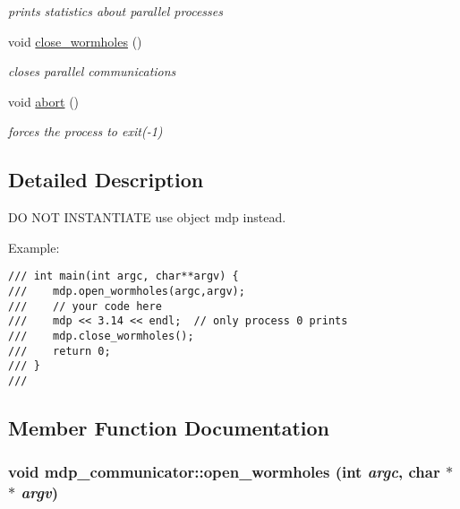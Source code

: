 \begin{CompactItemize}
\begin{CompactList}\small\item\em prints statistics about parallel processes \item\end{CompactList}\item 
\hypertarget{classmdp__communicator_d9941f7db0a5a447e37e8372b15f83f9}{
void \hyperlink{classmdp__communicator_d9941f7db0a5a447e37e8372b15f83f9}{close\_\-wormholes} ()}
\label{classmdp__communicator_d9941f7db0a5a447e37e8372b15f83f9}

\begin{CompactList}\small\item\em closes parallel communications \item\end{CompactList}\item 
\hypertarget{classmdp__communicator_a601b7788f242a7f71b955a6bdf7e002}{
void \hyperlink{classmdp__communicator_a601b7788f242a7f71b955a6bdf7e002}{abort} ()}
\label{classmdp__communicator_a601b7788f242a7f71b955a6bdf7e002}

\begin{CompactList}\small\item\em forces the process to exit(-1) \item\end{CompactList}\end{CompactItemize}


\subsection{Detailed Description}
DO NOT INSTANTIATE use object mdp instead. 

Example: 

\footnotesize\begin{verbatim}
/// int main(int argc, char**argv) {
///    mdp.open_wormholes(argc,argv);
///    // your code here
///    mdp << 3.14 << endl;  // only process 0 prints
///    mdp.close_wormholes();
///    return 0;
/// }
/// \end{verbatim}
\normalsize
 

\subsection{Member Function Documentation}
\hypertarget{classmdp__communicator_f2c43869a689b8f1d020d4c4995b0cee}{
\subsubsection[{open\_\-wormholes}]{\setlength{\rightskip}{0pt plus 5cm}void mdp\_\-communicator::open\_\-wormholes (int {\em argc}, \/  char $\ast$$\ast$ {\em argv})}}
\label{classmdp__communicator_f2c43869a689b8f1d020d4c4995b0cee}


